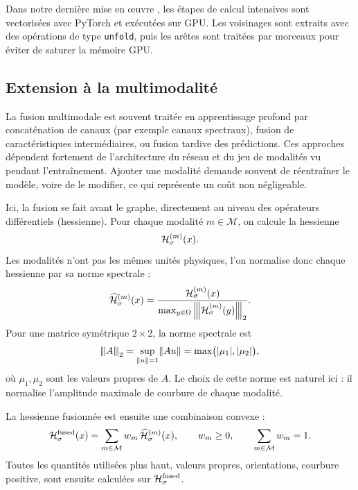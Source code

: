 Dans notre dernière mise en œuvre \cite{BibiISPRS}, les étapes de calcul intensives sont vectorisées avec PyTorch et exécutées sur GPU. Les voisinages sont extraits avec des opérations de type \texttt{unfold}, puis les arêtes sont traitées par morceaux pour éviter de saturer la mémoire GPU.

\subsection{Extension à la multimodalité}
\label{subsec:chapIII_multimodalite}

La fusion multimodale est souvent traitée en apprentissage profond par concaténation de canaux (par exemple canaux spectraux), fusion de caractéristiques intermédiaires, ou fusion tardive des prédictions. 
Ces approches dépendent fortement de l'architecture du réseau et du jeu de modalités vu pendant l'entraînement. Ajouter une modalité demande souvent de réentraîner le modèle, voire de le modifier, ce qui représente un coût non négligeable.

Ici, la fusion se fait avant le graphe, directement au niveau des opérateurs différentiels (hessienne). Pour chaque modalité $m\in\mathcal M$, on calcule la hessienne
\[
    \mathcal H^{(m)}_\sigma(x).
\]
Les modalités n'ont pas les mêmes unités physiques, l'on normalise donc chaque hessienne par sa norme spectrale \cite{AvrachenkovDreveton2022} :
\begin{equation}
    \widehat{\mathcal H}^{(m)}_\sigma(x)
    =
    \frac{\mathcal H^{(m)}_\sigma(x)}{\max_{y\in\Omega}\left\lvert\mkern-2mu\left\lvert\mkern-2mu\left\lvert \mathcal H^{(m)}_\sigma(y) \right\rvert\mkern-2mu\right\rvert\mkern-2mu\right\rvert_2}.
    \label{eq:chapIII_hessian_norm}
\end{equation}
Pour une matrice symétrique $2\times2$, la norme spectrale est
\begin{equation}
    \left\lvert\mkern-2mu\left\lvert\mkern-2mu\left\lvert A \right\rvert\mkern-2mu\right\rvert\mkern-2mu\right\rvert_2
    =
    \sup_{\lVert u \rVert=1}\lVert Au \rVert
    =
    \max\bigl(|\mu_1|,|\mu_2|\bigr),
    \label{eq:chapIII_spectral_norm}
\end{equation}
où $\mu_1,\mu_2$ sont les valeurs propres de $A$. Le choix de cette norme est naturel ici : il normalise l'amplitude maximale de courbure de chaque modalité.

La hessienne fusionnée est ensuite une combinaison convexe :
\begin{equation}
    \mathcal H^{\mathrm{fused}}_\sigma(x)
    =
    \sum_{m\in\mathcal M} w_m\,\widehat{\mathcal H}^{(m)}_\sigma(x),
    \qquad
    w_m\ge0,
    \qquad
    \sum_{m\in\mathcal M} w_m=1.
    \label{eq:chapIII_fusion}
\end{equation}
Toutes les quantités utilisées plus haut, valeurs propres, orientations, courbure positive, sont ensuite calculées sur $\mathcal H^{\mathrm{fused}}_\sigma$.

